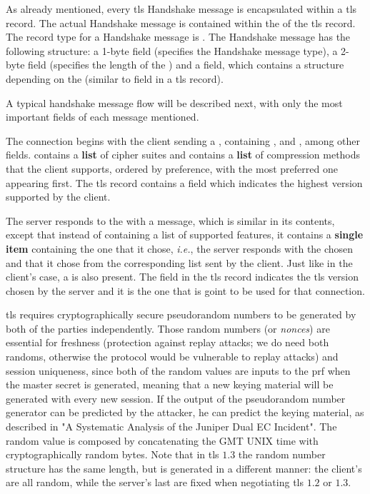 \documentclass{llncs}
\begin{document}
As already mentioned, every \gls{tls} Handshake message is encapsulated within
a \gls{tls} record. The actual Handshake message is contained within the
 of the \gls{tls} record. The record type for a Handshake
message is . The Handshake message has the following structure:
a 1-byte  field (specifies the Handshake message type),
a 2-byte  field (specifies the length of the )
and a  field, which contains a structure depending on the
 (similar to  field in a \gls{tls} record).

A typical handshake message flow will be described next, with only the most important fields of each message mentioned.

The connection begins with the client sending a , containing ,  and ,
among other fields.
 contains a \textbf{list} of cipher suites and 
contains a \textbf{list} of compression methods that the
client supports, ordered by preference, with the most preferred one appearing first.
The \gls{tls} record contains a   field which
indicates the highest version supported by the client.

The server responds to the  with a 
message, which is similar in its contents, except that instead of containing
a list of supported features, it contains a \textbf{single item} containing the one that it chose,
\textit{i.e.}, the server responds with the chosen  and
 that it chose from the
corresponding list sent by the client. Just like in the client's case, a 
is also present. The  field in the \gls{tls} record indicates
the \gls{tls} version chosen by the server and it is the one that is goint to be
used for that connection.

\gls{tls} requires cryptographically secure pseudorandom numbers to be generated
by both of the parties independently. Those random numbers (or \textit{nonces}) are essential for freshness
(protection against replay attacks; we do need both randoms, otherwise the
protocol would be vulnerable to replay attacks) and session uniqueness, since both of
the random values are inputs to the \gls{prf} when the master secret is generated, meaning
that a new keying material will be generated with every new session. If the output of the pseudorandom number generator
can be predicted by the attacker, he can predict the keying material, as described
in "A Systematic Analysis of the Juniper Dual EC Incident"\cite{DualECJu15:online}.
The  random value is composed by concatenating the 
GMT UNIX time with  cryptographically random bytes. Note that in \gls{tls} $1.3$
the random number structure has the same length, but is generated in a different manner:
the client's  are all random, while the server's last 
are fixed when negotiating \gls{tls} $1.2$ or $1.3$.
\end{document}

